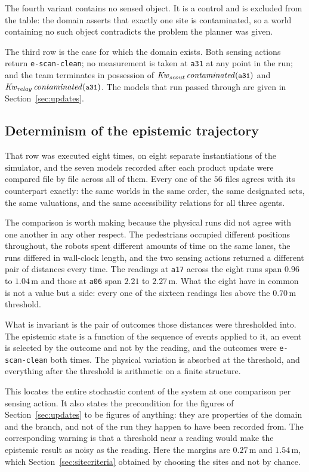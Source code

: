 \documentclass[11pt,a4paper]{article}
\theoremstyle{definition}
\newcommand{\Kw}[1]{\mathit{Kw}_{#1}}
\newcommand{\code}[1]{\texttt{\small #1}}
\newcommand{\site}[1]{\code{#1}}
\begin{document}
The fourth variant contains no sensed object. It is a control and is excluded
from the table: the domain asserts that exactly one site is contaminated, so a
world containing no such object contradicts the problem the planner was given.

The third row is the case for which the domain exists. Both sensing actions
return \code{e-scan-clean}; no measurement is taken at \site{a31} at any point
in the run; and the team terminates in possession of
$\Kw{\mathit{scout}}\,\mathit{contaminated}(\site{a31})$ and
$\Kw{\mathit{relay}}\,\mathit{contaminated}(\site{a31})$. The models that run
passed through are given in Section~\ref{sec:updates}.

\subsection{Determinism of the epistemic trajectory}
\label{sec:determinism}

That row was executed eight times, on eight separate instantiations of the
simulator, and the seven models recorded after each product update were
compared file by file across all of them. Every one of the $56$ files agrees
with its counterpart exactly: the same worlds in the same order, the same
designated sets, the same valuations, and the same accessibility relations for
all three agents.

The comparison is worth making because the physical runs did not agree with
one another in any other respect. The pedestrians occupied different positions
throughout, the robots spent different amounts of time on the same lanes, the
runs differed in wall-clock length, and the two sensing actions returned a
different pair of distances every time. The readings at \site{a17} across the
eight runs span $0.96$ to $1.04$\,m and those at \site{a06} span $2.21$ to
$2.27$\,m. What the eight have in common is not a value but a side: every one
of the sixteen readings lies above the $0.70$\,m threshold.

What is invariant is the pair of outcomes those distances were thresholded
into. The epistemic state is a function of the sequence of events applied to
it, an event is selected by the outcome and not by the reading, and the
outcomes were \code{e-scan-clean} both times. The physical variation is
absorbed at the threshold, and everything after the threshold is arithmetic on
a finite structure.

This locates the entire stochastic content of the system at one comparison per
sensing action. It also states the precondition for the figures of
Section~\ref{sec:updates} to be figures of anything: they are properties of the
domain and the branch, and not of the run they happen to have been recorded
from. The corresponding warning is that a threshold near a reading would make
the epistemic result as noisy as the reading. Here the margins are $0.27$\,m
and $1.54$\,m, which Section~\ref{sec:sitecriteria} obtained by choosing the
sites and not by chance.
\end{document}
